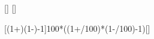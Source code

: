 [\percent]
[\percent]

[\left(1+\right)\left(1-\right)-1]{100*((1+\fVX/100)*(1-\fpX/100)-1)}[\percent]
